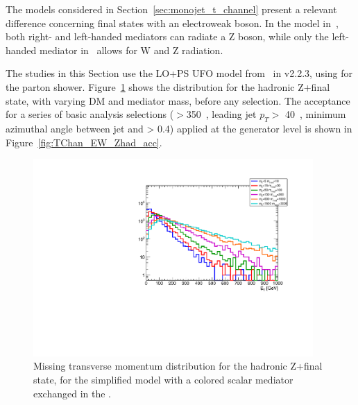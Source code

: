 The models considered in Section~\ref{sec:monojet_t_channel}
present a relevant difference concerning final states with an electroweak boson.
In the model in~\cite{Bell:2012rg}, both right- and left-handed mediators can radiate a Z boson,
while only the left-handed mediator in~\cite{Bell:2012rg} allows for W and Z radiation.~

The studies in this Section use the LO+PS UFO model from~\cite{Bell:2012rg} in \madgraph v2.2.3, 
using  for the parton shower.
Figure~\ref{fig:TChan_EW_Zhad_MET} shows the \MET distribution for the hadronic Z+\MET final state, 
with varying DM and mediator mass, before any selection. 
The acceptance for a series of basic analysis selections
(\MET$>$350~\gev, leading jet $p_T >$ 40~\gev, minimum azimuthal angle between jet and \MET > 0.4) 
applied at the generator level is shown in Figure~\ref{fig:TChan_EW_Zhad_acc}. 

\begin{figure}[h!]
	\centering  
	\includegraphics[width=0.95\textwidth]{figures/EW/monoZhad_TChannel/metPt}
	\caption{Missing transverse momentum distribution for the hadronic Z+\MET final state,
		for the simplified model with a colored scalar mediator exchanged in the \tchannel.}
	\label{fig:TChan_EW_Zhad_MET}
\end{figure}

